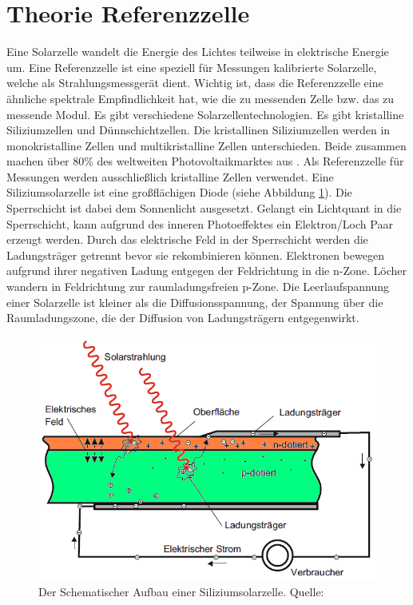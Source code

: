 \documentclass[a4paper,bibtotoc,oneside]{scrbook}
\begin{document}
\section{Theorie Referenzzelle}\thispagestyle{empty}
Eine Solarzelle wandelt die Energie des Lichtes teilweise in elektrische Energie um. Eine Referenzzelle ist eine speziell für Messungen kalibrierte Solarzelle, welche als Strahlungsmessgerät dient. Wichtig ist, dass die Referenzzelle eine ähnliche spektrale Empfindlichkeit hat, wie die zu messenden Zelle bzw. das zu messende Modul.
Es gibt verschiedene Solarzellentechnologien. Es gibt kristalline Siliziumzellen und Dünnschichtzellen. Die kristallinen Siliziumzellen werden in monokristalline Zellen und multikristalline Zellen unterschieden. Beide zusammen machen über 80\% des weltweiten Photovoltaikmarktes aus \cite{iea00}. Als Referenzzelle für Messungen werden ausschließlich kristalline Zellen verwendet. 
Eine Siliziumsolarzelle ist eine großflächigen Diode (siehe Abbildung \ref{cell}). Die Sperrschicht ist dabei dem Sonnenlicht ausgesetzt. Gelangt ein Lichtquant in die Sperrschicht, kann aufgrund des inneren Photoeffektes ein Elektron/Loch Paar erzeugt werden. Durch das elektrische Feld in der Sperrschicht werden die Ladungsträger getrennt bevor sie rekombinieren können. Elektronen bewegen aufgrund ihrer negativen Ladung entgegen der Feldrichtung in die n-Zone. Löcher wandern in Feldrichtung zur raumladungsfreien p-Zone. Die Leerlaufspannung einer Solarzelle ist kleiner als die Diffusionsspannung, der Spannung über die Raumladungszone, die der Diffusion von Ladungsträgern entgegenwirkt.
\begin{figure}[htbp]
\centering
\includegraphics[width=125mm]{img/zelle2.png}
\caption{Der Schematischer Aufbau einer Siliziumsolarzelle. Quelle: \cite{pv}}\label{cell}
\end{figure}
\end{document}
